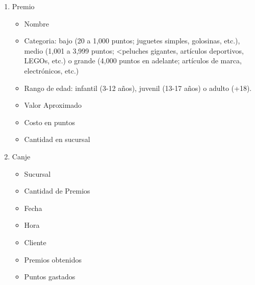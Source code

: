 \begin{enumerate}
    \item Premio
    \begin{itemize}
        \item Nombre
        \item Categoria: bajo (20 a 1,000 puntos; juguetes simples, golosinas, etc.), medio (1,001 a 3,999 puntos; <peluches gigantes, artículos deportivos, LEGOs, etc.) o grande (4,000 puntos en adelante; artículos de marca, electrónicos, etc.)
        \item Rango de edad: infantil (3-12 años), juvenil (13-17 años) o adulto (+18).
        \item Valor Aproximado
        \item Costo en puntos
        \item Cantidad en sucursal
    \end{itemize}

    \item Canje
      \begin{itemize}
      \item Sucursal
      \item Cantidad de Premios
        \item Fecha
        \item Hora
        \item Cliente
        \item Premios obtenidos
        \item Puntos gastados
    \end{itemize}


\end{enumerate}
